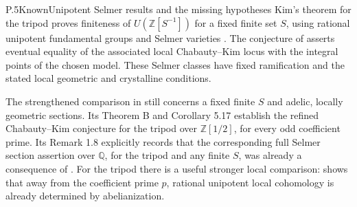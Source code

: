 \begin{result}{P.5}{Known}{Unipotent Selmer results and the missing hypotheses}
Kim's theorem for the tripod proves finiteness of
\(U(\mathbb Z[S^{-1}])\) for a fixed finite set \(S\), using
rational unipotent fundamental groups and Selmer varieties
\citep[\S3, concluding proof of Siegel's theorem, author pp.~17--18]{LitKim2005}.
The conjecture of \citet[\S1.3 and Conjecture 3.1,
author pp.~2--3 and 12; finite-$S$ variant in \S8]{LitBDCKW2018}
asserts eventual equality of the associated local Chabauty--Kim locus
with the integral points of the chosen model. These Selmer classes have
fixed ramification and the stated local geometric and crystalline
conditions.

The strengthened comparison in
\citet[Theorem A; Definition 2.1; \S2.2.1 and Lemma 2.19]{LitBKL2026}
still concerns a fixed finite \(S\) and adelic, locally geometric
sections. Its Theorem B and Corollary 5.17 establish the refined
Chabauty--Kim conjecture for the tripod over \(\mathbb Z[1/2]\),
for every odd coefficient prime. Its Remark 1.8 explicitly records that
the corresponding full Selmer section assertion over \(\mathbb Q\),
for the tripod and any finite \(S\), was already a consequence of
\citet[Corollary 6, author p.~6]{Stix2015}.
For the tripod there is a useful stronger local comparison:
\citet[Lemma 4.2 and Corollary 4.3, author pp.~31--32]{LitBKL2026}
shows that away from the coefficient prime \(p\), rational unipotent
local cohomology is already determined by abelianization.
\end{result}

